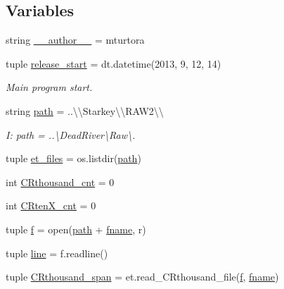 \subsection*{Variables}
\begin{DoxyCompactItemize}
\item 
string \hyperlink{namespace_date___ranges___concat_ac343717504128e865654d5aa6243c692}{\+\_\+\+\_\+author\+\_\+\+\_\+} = \textquotesingle{}mturtora\textquotesingle{}
\item 
tuple \hyperlink{namespace_date___ranges___concat_a547bfe8822d57255b64be4659758e9bc}{release\+\_\+start} = dt.\+datetime(2013, 9, 12, 14)
\begin{DoxyCompactList}\small\item\em Main program start. \end{DoxyCompactList}\item 
string \hyperlink{namespace_date___ranges___concat_a2b3a66331b773dfcae06fbf3e0426bc8}{path} = \textquotesingle{}..\textbackslash{}\textbackslash{}Starkey\textbackslash{}\textbackslash{}\+R\+A\+W2\textbackslash{}\textbackslash{}\textquotesingle{}
\begin{DoxyCompactList}\small\item\em I\+: path = \textquotesingle{}..\textbackslash{}Dead\+River\textbackslash{}Raw\textbackslash{}\textquotesingle{}. \end{DoxyCompactList}\item 
tuple \hyperlink{namespace_date___ranges___concat_ad0a440f18491626dabb985b4571b9a96}{et\+\_\+files} = os.\+listdir(\hyperlink{namespace_date___ranges___concat_a2b3a66331b773dfcae06fbf3e0426bc8}{path})
\item 
int \hyperlink{namespace_date___ranges___concat_af8527316eb015c858bcbf22aa4a3ead8}{C\+Rthousand\+\_\+cnt} = 0
\item 
int \hyperlink{namespace_date___ranges___concat_a7ef25cabc133407cacce6c54c47d4ef6}{C\+Rten\+X\+\_\+cnt} = 0
\item 
tuple \hyperlink{namespace_date___ranges___concat_a21362afa3c3692b51bae83ce0459dcd7}{f} = open(\hyperlink{namespace_date___ranges___concat_a2b3a66331b773dfcae06fbf3e0426bc8}{path} + \hyperlink{namespace_date___ranges___concat_a86701c1e83bc108fd48d569692baf90a}{fname}, \textquotesingle{}r\textquotesingle{})
\item 
tuple \hyperlink{namespace_date___ranges___concat_a59784c3a4edaac118af91459499ef2ce}{line} = f.\+readline()
\item 
tuple \hyperlink{namespace_date___ranges___concat_ab1f6fe2daf46f0f39aaa5ea22ca94dd4}{C\+Rthousand\+\_\+span} = et.\+read\+\_\+\+C\+Rthousand\+\_\+file(\hyperlink{namespace_date___ranges___concat_a21362afa3c3692b51bae83ce0459dcd7}{f}, \hyperlink{namespace_date___ranges___concat_a86701c1e83bc108fd48d569692baf90a}{fname})

\end{DoxyCompactItemize}
